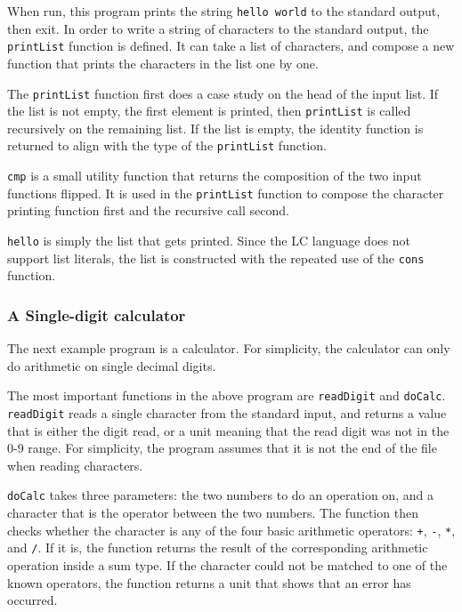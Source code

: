 \documentclass[12pt]{article}
\begin{document}
When run, this program prints the string \verb$hello world$ to the standard
output, then exit. In order to write a string of characters to the standard
output, the \verb$printList$ function is defined. It can take a list of
characters, and compose a new function that prints the characters in the list
one by one.

The \verb$printList$ function first does a case study on the head of the input
list. If the list is not empty, the first element is printed, then
\verb$printList$ is called recursively on the remaining list. If the list is
empty, the identity function is returned to align with the type of the
\verb$printList$ function.

\verb$cmp$ is a small utility function that returns the composition of the two
input functions flipped. It is used in the \verb$printList$ function to compose
the character printing function first and the recursive call second.

\verb$hello$ is simply the list that gets printed. Since the LC language does
not support list literals, the list is constructed with the repeated use of the
\verb$cons$ function.

\subsubsection{A Single-digit calculator}

The next example program is a calculator. For simplicity, the calculator can
only do arithmetic on single decimal digits.



The most important functions in the above program are \verb$readDigit$ and
\verb$doCalc$. \verb$readDigit$ reads a single character from the standard
input, and returns a value that is either the digit read, or a unit meaning that
the read digit was not in the 0-9 range. For simplicity, the program assumes
that it is not the end of the file when reading characters.

\verb$doCalc$ takes three parameters: the two numbers to do an operation on, and
a character that is the operator between the two numbers. The function then
checks whether the character is any of the four basic arithmetic operators:
\verb$+$, \verb$-$, \verb$*$, and \verb$/$. If it is, the function returns the
result of the corresponding arithmetic operation inside a sum type. If the
character could not be matched to one of the known operators, the function
returns a unit that shows that an error has occurred.
\end{document}
